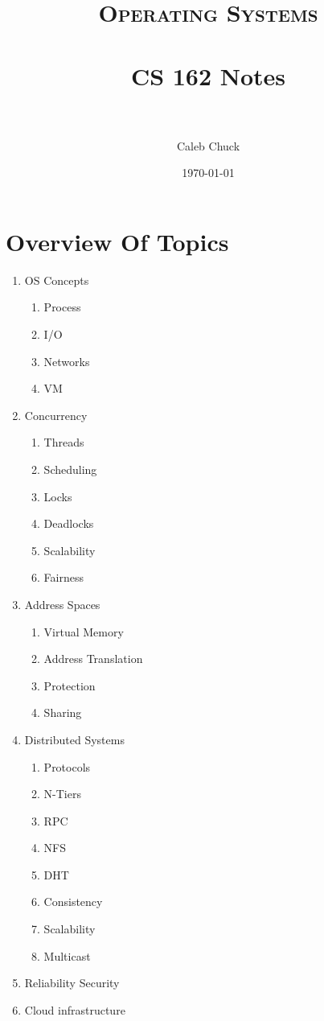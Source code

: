 \documentclass[paper=a4, fontsize=11pt]{scrartcl} %
\title{	
\normalfont \normalsize 
\textsc{Operating Systems} \\ [25pt] %
\horrule{0.5pt} \\[0.4cm] %
\huge CS 162 Notes \\ %
\horrule{2pt} \\[0.5cm] %
}
\author{Caleb Chuck} %
\date{\normalsize\today} %
\numberwithin{equation}{section} %
\numberwithin{figure}{section} %
\numberwithin{table}{section} %
\begin{document}
\maketitle %
\section{Overview Of Topics}
\begin{enumerate}
	\item OS Concepts
    \begin{enumerate}
    	\item Process
        \item I/O
        \item Networks
        \item VM
    \end{enumerate}
    \item Concurrency
    \begin{enumerate}
    	\item Threads
        \item Scheduling
        \item Locks
        \item Deadlocks
        \item Scalability
        \item Fairness
    \end{enumerate}
    \item Address Spaces
    \begin{enumerate}
    	\item Virtual Memory
        \item Address Translation
        \item Protection
        \item Sharing
    \end{enumerate}
    \item Distributed Systems
    \begin{enumerate}
    	\item Protocols
        \item N-Tiers
        \item RPC
        \item NFS
        \item DHT
        \item Consistency
        \item Scalability
        \item Multicast
    \end{enumerate}
    \item Reliability Security
    \item Cloud infrastructure
\end{enumerate}
\end{document}
